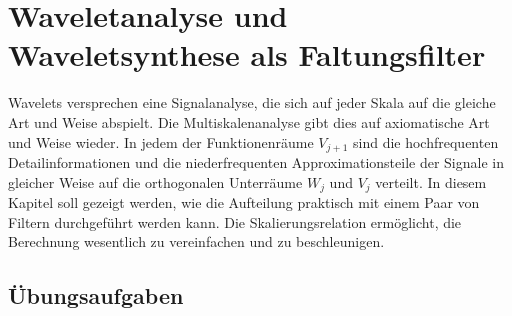 %
%
%
\chapter{Waveletanalyse und Waveletsynthese als Faltungsfilter
\label{chapter:algo}}
Wavelets versprechen eine Signalanalyse, die sich auf jeder Skala auf
die gleiche Art und Weise abspielt.
Die Multiskalenanalyse gibt dies auf axiomatische Art und Weise wieder.
In jedem der Funktionenräume $V_{j+1}$ sind die
hochfrequenten Detailinformationen und die 
niederfrequenten Approximationsteile der Signale in gleicher Weise auf die 
orthogonalen Unterräume $W_j$ und $V_j$ verteilt.
In diesem Kapitel soll gezeigt werden, wie die Aufteilung praktisch mit
einem Paar von Filtern durchgeführt werden kann.
Die Skalierungsrelation ermöglicht, die Berechnung wesentlich zu 
vereinfachen und zu beschleunigen.





\section*{Übungsaufgaben}






